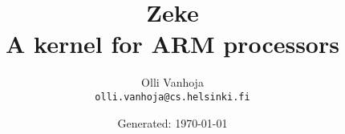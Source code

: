 \documentclass[11pt,oneside,a4paper]{book}
\title{%
  Zeke\\
  A kernel for ARM processors
}
\author{%
  Olli Vanhoja\\
  \texttt{olli.vanhoja@cs.helsinki.fi}
}
\date{%
Generated: \today
}
\begin{document}
  \maketitle
  \tableofcontents
  
  
  
  
  
  
  
  
  
  
  
  {}
  
\end{document}
